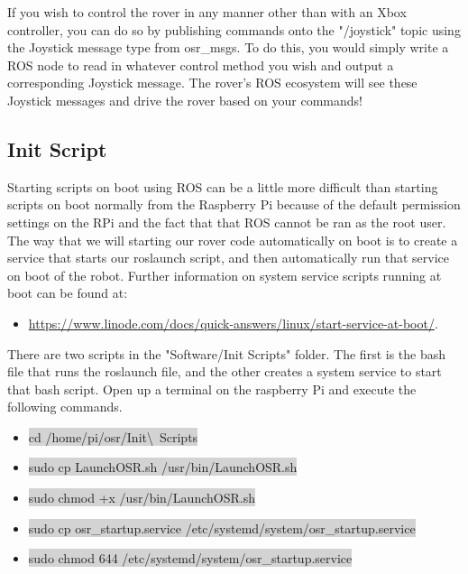\documentclass{article}
\begin{document}
\bigskip 

\noindent If you wish to control the rover in any manner other than with an Xbox controller, you can do so by publishing commands onto the "/joystick" topic using the Joystick message type from osr\_msgs. To do this, you would simply write a ROS node to read in whatever control method you wish and output a corresponding Joystick message. The rover's ROS ecosystem will see these Joystick messages and drive the rover based on your commands!

\subsection{Init Script}

Starting scripts on boot using ROS can be a little more difficult than starting scripts on boot normally from the Raspberry Pi because of the default permission settings on the RPi and the fact that that ROS cannot be ran as the root user. The way that we will starting our rover code automatically on boot is to create a service that starts our roslaunch script, and then automatically run that service on boot of the robot. Further information on system service scripts running at boot can be found at: 

\begin{itemize}
	\item \href{https://www.linode.com/docs/quick-answers/linux/start-service-at-boot/}{https://www.linode.com/docs/quick-answers/linux/start-service-at-boot/}. 
\end{itemize}

There are two scripts in the "Software/Init Scripts" folder. The first is the bash file that runs the roslaunch file, and the other creates a system service to start that bash script. Open up a terminal on the raspberry Pi and execute the following commands.

\begin{itemize}
	\item[] \colorbox{lightgray}{cd /home/pi/osr/Init\textbackslash\ Scripts}
	\item[] \colorbox{lightgray}{sudo cp LaunchOSR.sh /usr/bin/LaunchOSR.sh}
	\item[] \colorbox{lightgray}{sudo chmod +x /usr/bin/LaunchOSR.sh}
	\item[] \colorbox{lightgray}{sudo cp osr\_startup.service /etc/systemd/system/osr\_startup.service}
	\item[] \colorbox{lightgray}{sudo chmod 644 /etc/systemd/system/osr\_startup.service}
\end{itemize}
\end{document}
